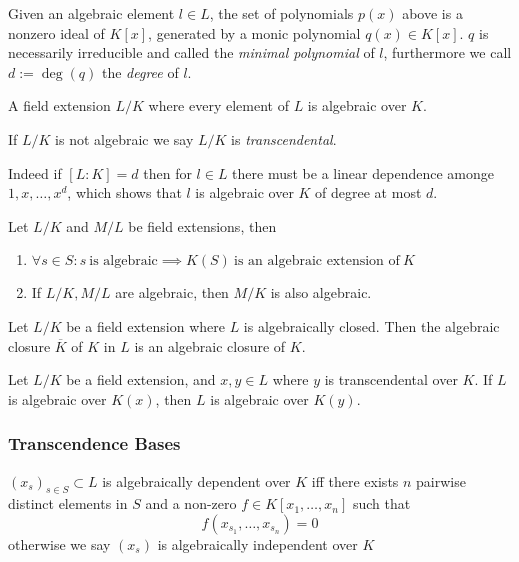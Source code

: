 Given an algebraic element \(l \in L\), the set of polynomials \(p(x)\) above is a nonzero ideal of \(K[x]\), generated by a monic polynomial \(q(x) \in K[x]\).
\(q\) is necessarily irreducible and called the \emph{minimal polynomial} of \(l\), furthermore we call \(d := \deg(q)\) the \emph{degree} of \(l\).

\begin{definition}
   A field extension \(L/K\) where every element of \(L\) is algebraic over \(K\).
\end{definition}
\begin{remark}[Terminology]
   If \(L/K\) is not algebraic we say \(L/K\) is \emph{transcendental}.
\end{remark}
\begin{remark}
   Indeed if \([L:K] = d\) then for \(l \in L\) there must be a linear dependence amonge \(1, x, \ldots, x^d\), which shows that \(l\) is algebraic over \(K\) of degree at most \(d\).
\end{remark}

\begin{proposition}
   Let \(L/K\) and \(M/L\) be field extensions, then
   \begin{enumerate}[label=\roman*, align=Center]
      \item \(\forall s \in S: s~\text{is algebraic} \implies K(S)~\text{is an algebraic extension of}~K\)
      \item If \(L/K, M/L\) are algebraic, then \(M/K\) is also algebraic.
   \end{enumerate}
\end{proposition}

\begin{proposition}
   Let \(L/K\) be a field extension where \(L\) is algebraically closed.
   Then the algebraic closure \(\overline{K}\) of \(K\) in \(L\) is an algebraic closure of \(K\).
\end{proposition}

\begin{lemma}
   Let \(L/K\) be a field extension, and \(x, y \in L\) where \(y\) is transcendental over \(K\).
   If \(L\) is algebraic over \(K(x)\), then \(L\) is algebraic over \(K(y)\).
\end{lemma}

\subsubsection{Transcendence Bases}
\begin{definition}
   \((x_s)_{s \in S} \subset L\) is algebraically dependent over \(K\) iff there exists \(n\) pairwise distinct elements in \(S\) and a non-zero \(f \in K[x_1, \ldots, x_n]\) such that
   \[f(x_{s_1}, \ldots, x_{s_n}) = 0\]
   otherwise we say \((x_s)\) is algebraically independent over \(K\)
\end{definition}

